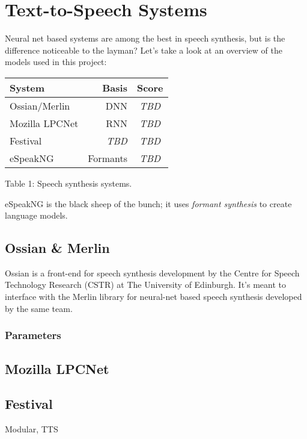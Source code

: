 \documentclass[11pt,a4paper]{article}
\begin{document}
\section{Text-to-Speech Systems}\label{sect:dnn}
Neural net based systems are among the best in speech synthesis, but is the difference noticeable to the layman? Let's take a look at an overview of the models used in this project: %
\begin{center}
	\begin{tabular}{|l|r|c|}
		\hline \bf System & \bf Basis & \bf Score \\ \hline
		Ossian/Merlin & DNN & \textit{TBD} \\
		Mozilla LPCNet & RNN & \textit{TBD} \\
		Festival & \textit{TBD} & \textit{TBD} \\
		eSpeakNG & Formants & \textit{TBD} \\
		\hline
	\end{tabular}

\label{font-table}Table 1: Speech synthesis systems.
\end{center}

eSpeakNG is the black sheep of the bunch; it uses \textit{formant synthesis} to create language models.

\subsection{Ossian \& Merlin}\label{ssec:ossian}
Ossian is a front-end for speech synthesis development by the Centre for Speech Technology Research (CSTR) at The University of Edinburgh. It's meant to interface with the Merlin library for neural-net based speech synthesis developed by the same team.

\subsubsection{Parameters}

\subsection{Mozilla LPCNet}\label{ssec:lpcnet}

\subsection{Festival}\label{ssec:festival}
Modular, TTS
\end{document}
